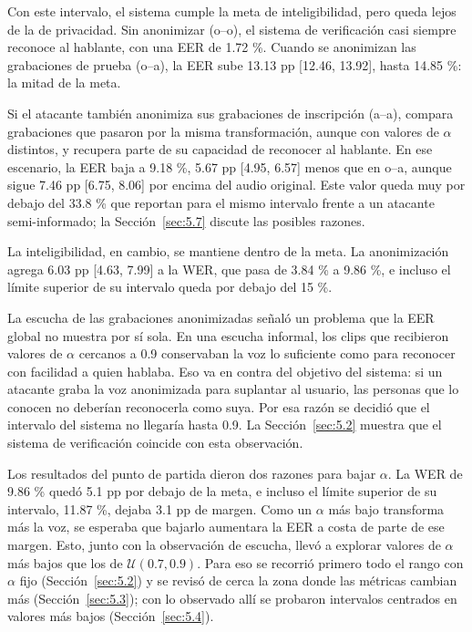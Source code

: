\documentclass[10pt,twocolumn]{article}
\newcommand{\textcite}[1]{\citet{#1}}
\begin{document}
Con este intervalo, el sistema cumple la meta de inteligibilidad, pero queda lejos de la de privacidad. Sin anonimizar (o--o), el sistema de verificación casi siempre reconoce al hablante, con una EER de 1.72 \%. Cuando se anonimizan las grabaciones de prueba (o--a), la EER sube 13.13 pp [12.46, 13.92], hasta 14.85 \%: la mitad de la meta.

Si el atacante también anonimiza sus grabaciones de inscripción (a--a), compara grabaciones que pasaron por la misma transformación, aunque con valores de $\alpha$ distintos, y recupera parte de su capacidad de reconocer al hablante. En ese escenario, la EER baja a 9.18 \%, 5.67 pp [4.95, 6.57] menos que en o--a, aunque sigue 7.46 pp [6.75, 8.06] por encima del audio original. Este valor queda muy por debajo del 33.8 \% que reportan \textcite{patino2021} para el mismo intervalo frente a un atacante semi-informado; la Sección~\ref{sec:5.7} discute las posibles razones.

La inteligibilidad, en cambio, se mantiene dentro de la meta. La anonimización agrega 6.03 pp [4.63, 7.99] a la WER, que pasa de 3.84 \% a 9.86 \%, e incluso el límite superior de su intervalo queda por debajo del 15 \%.

La escucha de las grabaciones anonimizadas señaló un problema que la EER global no muestra por sí sola. En una escucha informal, los clips que recibieron valores de $\alpha$ cercanos a 0.9 conservaban la voz lo suficiente como para reconocer con facilidad a quien hablaba. Eso va en contra del objetivo del sistema: si un atacante graba la voz anonimizada para suplantar al usuario, las personas que lo conocen no deberían reconocerla como suya. Por esa razón se decidió que el intervalo del sistema no llegaría hasta 0.9. La Sección~\ref{sec:5.2} muestra que el sistema de verificación coincide con esta observación.

Los resultados del punto de partida dieron dos razones para bajar $\alpha$. La WER de 9.86 \% quedó 5.1 pp por debajo de la meta, e incluso el límite superior de su intervalo, 11.87 \%, dejaba 3.1 pp de margen. Como un $\alpha$ más bajo transforma más la voz, se esperaba que bajarlo aumentara la EER a costa de parte de ese margen. Esto, junto con la observación de escucha, llevó a explorar valores de $\alpha$ más bajos que los de $\mathcal{U}(0.7, 0.9)$. Para eso se recorrió primero todo el rango con $\alpha$ fijo (Sección~\ref{sec:5.2}) y se revisó de cerca la zona donde las métricas cambian más (Sección~\ref{sec:5.3}); con lo observado allí se probaron intervalos centrados en valores más bajos (Sección~\ref{sec:5.4}).
\end{document}
